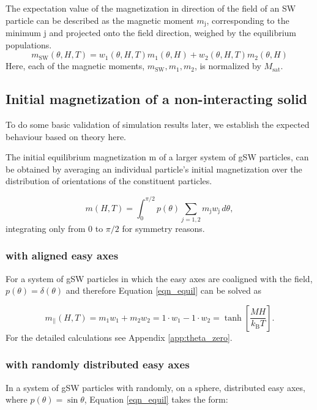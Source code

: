 \documentclass[12pt, DIV=12]{scrartcl}
\begin{document}
The expectation value of the magnetization in direction of the field of an SW particle can be described as the magnetic moment $m_\mathrm{j}$, corresponding to the minimum j and projected onto the field direction, weighed by the equilibrium populations.
\begin{equation}
    m_\mathrm{SW}(\theta,H,T) = w_1(\theta,H,T)m_1(\theta,H) + w_2(\theta,H,T)m_2(\theta,H)
\end{equation}
Here, each of the magnetic moments, $m_\mathrm{SW}, m_1, m_2$, is normalized by $M_\mathrm{sat}$.


\subsection{Initial magnetization of a non-interacting solid}
To do some basic validation of simulation results later, we establish the expected behaviour based on theory here.

The initial equilibrium magnetization m of a larger system of gSW particles, can be obtained by averaging an individual particle's initial magnetization over the distribution of orientations of the constituent particles.

\begin{equation}
    m(H,T) = \int_0^{\pi/2} p(\theta) \sum_{j=1,2}m_\mathrm{j}w_\mathrm{j} \,d\theta,
    \label{eqn_equil}
\end{equation}
integrating only from 0 to $\pi/2$ for symmetry reasons.

\subsubsection{with aligned easy axes}
For a system of gSW particles in which the easy axes are coaligned with the field, $p(\theta) = \delta(\theta)$ and therefore Equation \ref{eqn_equil} can be solved as

\begin{equation}
    m_\mathrm{||}(H,T) = m_1w_1 + m_2w_2 = 1\cdot w_1 -1 \cdot w_2 = \tanh\left[\frac{MH}{k_\mathrm{B}T}\right].
    \label{eqn_tanh}
\end{equation}
For the detailed calculations see Appendix \ref{app:theta_zero}.
\subsubsection{with randomly distributed easy axes}
In a system of gSW particles with randomly, on a sphere, distributed easy axes, where $p(\theta) = \sin \theta$, Equation \ref{eqn_equil} takes the form:
\end{document}
